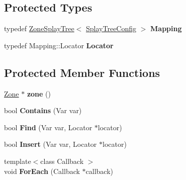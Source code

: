 \subsection*{Protected Types}
\begin{DoxyCompactItemize}
\item 
typedef \hyperlink{classv8_1_1internal_1_1_zone_splay_tree}{Zone\+Splay\+Tree}$<$ \hyperlink{structv8_1_1internal_1_1_effects_base_1_1_splay_tree_config}{Splay\+Tree\+Config} $>$ {\bfseries Mapping}\hypertarget{classv8_1_1internal_1_1_effects_base_a9d50f78598972d7746c825a0699079d8}{}\label{classv8_1_1internal_1_1_effects_base_a9d50f78598972d7746c825a0699079d8}

\item 
typedef Mapping\+::\+Locator {\bfseries Locator}\hypertarget{classv8_1_1internal_1_1_effects_base_a2eec985884f11293e0b4c7612061713b}{}\label{classv8_1_1internal_1_1_effects_base_a2eec985884f11293e0b4c7612061713b}

\end{DoxyCompactItemize}
\subsection*{Protected Member Functions}
\begin{DoxyCompactItemize}
\item 
\hyperlink{classv8_1_1internal_1_1_zone}{Zone} $\ast$ {\bfseries zone} ()\hypertarget{classv8_1_1internal_1_1_effects_base_a3f6f6d32a2b6b2ed41a1abe9cbf5e959}{}\label{classv8_1_1internal_1_1_effects_base_a3f6f6d32a2b6b2ed41a1abe9cbf5e959}

\item 
bool {\bfseries Contains} (Var var)\hypertarget{classv8_1_1internal_1_1_effects_base_a092dba675cad8f4a054a35cf20e7d0da}{}\label{classv8_1_1internal_1_1_effects_base_a092dba675cad8f4a054a35cf20e7d0da}

\item 
bool {\bfseries Find} (Var var, Locator $\ast$locator)\hypertarget{classv8_1_1internal_1_1_effects_base_a11ee6a83a9148623f3426ea6f411ee31}{}\label{classv8_1_1internal_1_1_effects_base_a11ee6a83a9148623f3426ea6f411ee31}

\item 
bool {\bfseries Insert} (Var var, Locator $\ast$locator)\hypertarget{classv8_1_1internal_1_1_effects_base_a1bf65f3f0fe10656820159faf058bc6d}{}\label{classv8_1_1internal_1_1_effects_base_a1bf65f3f0fe10656820159faf058bc6d}

\item 
{\footnotesize template$<$class Callback $>$ }\\void {\bfseries For\+Each} (Callback $\ast$callback)\hypertarget{classv8_1_1internal_1_1_effects_base_ae01d9d6c0a2374be8ae05c05dc9450fe}{}\label{classv8_1_1internal_1_1_effects_base_ae01d9d6c0a2374be8ae05c05dc9450fe}

\end{DoxyCompactItemize}
